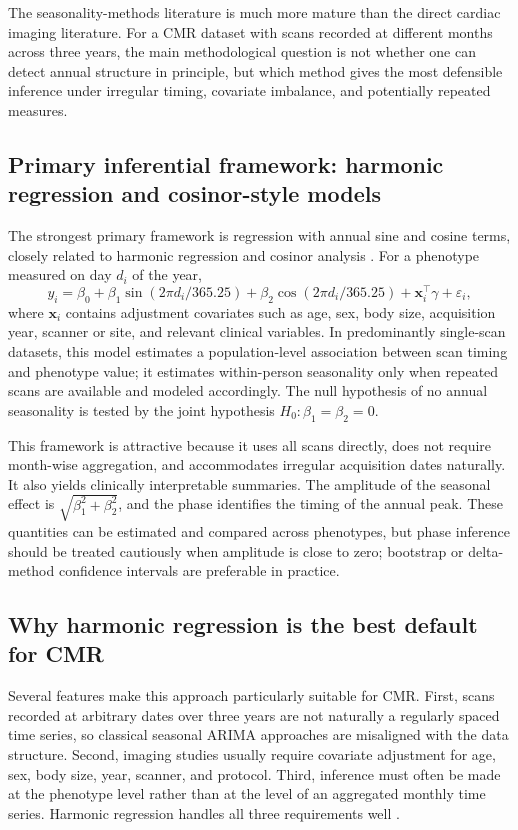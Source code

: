 The seasonality-methods literature is much more mature than the direct cardiac imaging literature. For a CMR dataset with scans recorded at different months across three years, the main methodological question is not whether one can detect annual structure in principle, but which method gives the most defensible inference under irregular timing, covariate imbalance, and potentially repeated measures.

\subsection*{Primary inferential framework: harmonic regression and cosinor-style models}

The strongest primary framework is regression with annual sine and cosine terms, closely related to harmonic regression and cosinor analysis \cite{Edwards1961,Serfling1963,Stolwijk1999,Nelson1979,Cornelissen2014}. For a phenotype measured on day $d_i$ of the year,
\[
 y_i = \beta_0 + \beta_1 \sin\left(2\pi d_i/365.25\right) + \beta_2 \cos\left(2\pi d_i/365.25\right) + \mathbf{x}_i^\top\gamma + \varepsilon_i,
\]
where $\mathbf{x}_i$ contains adjustment covariates such as age, sex, body size, acquisition year, scanner or site, and relevant clinical variables. In predominantly single-scan datasets, this model estimates a population-level association between scan timing and phenotype value; it estimates within-person seasonality only when repeated scans are available and modeled accordingly. The null hypothesis of no annual seasonality is tested by the joint hypothesis $H_0: \beta_1 = \beta_2 = 0$.

This framework is attractive because it uses all scans directly, does not require month-wise aggregation, and accommodates irregular acquisition dates naturally. It also yields clinically interpretable summaries. The amplitude of the seasonal effect is $\sqrt{\beta_1^2 + \beta_2^2}$, and the phase identifies the timing of the annual peak. These quantities can be estimated and compared across phenotypes, but phase inference should be treated cautiously when amplitude is close to zero; bootstrap or delta-method confidence intervals are preferable in practice.

\subsection*{Why harmonic regression is the best default for CMR}

Several features make this approach particularly suitable for CMR. First, scans recorded at arbitrary dates over three years are not naturally a regularly spaced time series, so classical seasonal ARIMA approaches are misaligned with the data structure. Second, imaging studies usually require covariate adjustment for age, sex, body size, year, scanner, and protocol. Third, inference must often be made at the phenotype level rather than at the level of an aggregated monthly time series. Harmonic regression handles all three requirements well \cite{Stolwijk1999,Cornelissen2014}.

